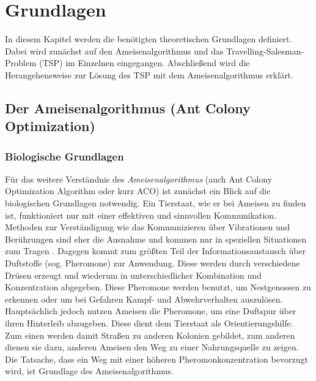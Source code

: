 \documentclass[doktyp=barbeit, sprache=german]{TUBAFarbeiten}
\begin{document}
\section{Grundlagen}
\label{sec:Grundlagen}
In diesem Kapitel werden die benötigten theoretischen Grundlagen definiert. Dabei wird zunächst auf den Ameisenalgorithmus und das Travelling-Salesman-Problem (TSP) im Einzelnen eingegangen. Abschließend wird die Herangehensweise zur Lösung des TSP mit dem Ameisenalgorithmus erklärt.
\subsection{Der Ameisenalgorithmus (Ant Colony Optimization)}
\subsubsection{Biologische Grundlagen}
Für das weitere Verständnis des \textit{Ameisenalgorithmus} (auch Ant Colony Optimization Algorithm oder kurz ACO) ist zunächst ein Blick auf die biologischen Grundlagen notwendig. Ein Tierstaat, wie er bei Ameisen zu finden ist, funktioniert nur mit einer effektiven und sinnvollen Kommunikation. Methoden zur Verständigung wie das Kommunizieren über Vibrationen und Berührungen sind eher die Ausnahme und kommen nur in speziellen Situationen zum Tragen \cite{Ameisen}. Dagegen kommt zum größten Teil der Informationsaustausch über Duftstoffe (sog. Pheromone) zur Anwendung. Diese werden durch verschiedene Drüsen erzeugt und wiederum in unterschiedlicher Kombination und Konzentration abgegeben.
Diese Pheromone werden benutzt, um Nestgenossen zu erkennen oder um bei Gefahren Kampf- und Abwehrverhalten auszulösen.
\\Hauptsächlich jedoch nutzen Ameisen die Pheromone, um eine Duftspur über ihren Hinterleib abzugeben. Diese dient dem Tierstaat als Orientierungshilfe. Zum einen werden damit Straßen zu anderen Kolonien gebildet, zum anderen dienen sie dazu, anderen Ameisen den Weg zu einer Nahrungsquelle zu zeigen. Die Tatsache, dass ein Weg mit einer höheren Pheromonkonzentration bevorzugt wird, ist Grundlage des Ameisenalgorithmus.
\end{document}
